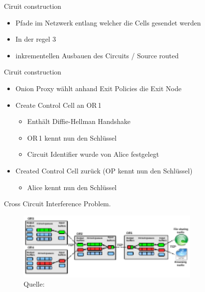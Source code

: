 \documentclass{beamer}
\begin{document}
\begin{frame}{Ciruit construction}
      \begin{itemize}
	\item Pfade im Netzwerk entlang welcher die Cells gesendet werden
	\item In der regel 3
	\item inkrementellen Ausbauen des Circuits / Source routed

      \end{itemize}

\end{frame}
 
 
\begin{frame}{Ciruit construction}
  \begin{figure}
  \end{figure}
  \begin{itemize}
    \item Onion Proxy wählt anhand Exit Policies die Exit Node
    \item Create Control Cell an OR\,1
      \begin{itemize}
	\item Enthält Diffie-Hellman Handshake
	\item OR\,1 kennt nun den Schlüssel
	\item Circuit Identifier wurde von Alice festgelegt
      \end{itemize}
    \item Created Control Cell zurück (OP kennt nun den Schlüssel)
      \begin{itemize}
	\item Alice kennt nun den Schlüssel
      \end{itemize}
  \end{itemize}
\end{frame}


\begin{frame}{Cross Circuit Interference Problem.}
  \begin{figure}
    \includegraphics[width=0.8\textwidth]{pics/BufferPic.pdf}
    \caption{ Quelle: \cite{pctcp}}
  \end{figure} 
\end{frame}
\end{document}
